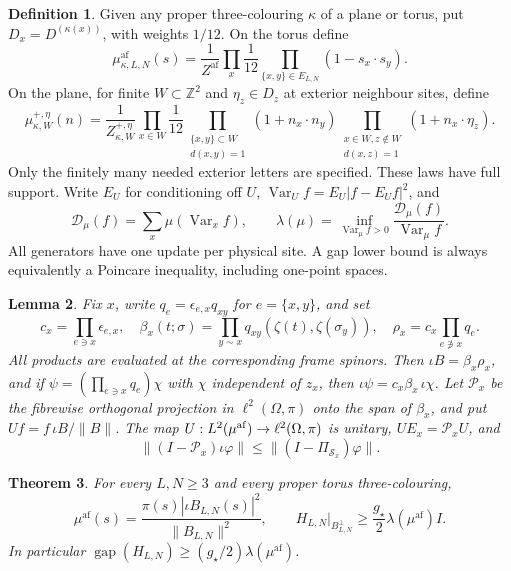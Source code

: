 \documentclass[11pt,reqno]{amsart}
\newtheorem{theorem}{Theorem}[section]
\newtheorem{lemma}[theorem]{Lemma}
\theoremstyle{definition}
\newtheorem{definition}[theorem]{Definition}
\theoremstyle{remark}
\begin{document}
\begin{definition}\label{d:framemodel}
Given any proper three-colouring \(\kappa\) of a plane or torus,
put \(D_x=D^{(\kappa(x))}\), with weights \(1/12\).
On the torus define
\[
 \mu^{\mathrm{af}}_{\kappa,L,N}(s)=
 \frac1{Z^{\mathrm{af}}}\prod_x\frac1{12}
       \prod_{\{x,y\}\in E_{L,N}}(1-s_x\cdot s_y).
\]
On the plane, for finite \(W\subset\mathbb Z^2\) and
\(\eta_z\in D_z\) at exterior neighbour sites, define
\[
 \mu^{+,\eta}_{\kappa,W}(n)=\frac1{Z^{+,\eta}_{\kappa,W}}
 \prod_{x\in W}\frac1{12}
 \prod_{\substack{\{x,y\}\subset W\\d(x,y)=1}}(1+n_x\cdot n_y)
 \prod_{\substack{x\in W,z\notin W\\d(x,z)=1}}(1+n_x\cdot\eta_z).
\]
Only the finitely many needed exterior letters are specified.
These laws have full support. Write \(E_U\) for conditioning off \(U\),
\(\operatorname{Var}_U f=E_U|f-E_Uf|^2\), and
\[
 \mathcal D_\mu(f)=\sum_x\mu(\operatorname{Var}_x f),\qquad
 \lambda(\mu)=\inf_{\operatorname{Var}_\mu f>0}
             \frac{\mathcal D_\mu(f)}{\operatorname{Var}_\mu f}.
\]
All generators have one update per physical site. A gap lower bound is
always equivalently a Poincare inequality, including one-point spaces.
\end{definition}

\begin{lemma}\label{l:quantumfibre}
Fix \(x\), write \(q_e=\epsilon_{e,x}q_{xy}\) for \(e=\{x,y\}\),
and set
\[
 c_x=\prod_{e\ni x}\epsilon_{e,x},\quad
 \beta_x(t;\sigma)=\prod_{y\sim x}q_{xy}(\zeta(t),\zeta(\sigma_y)),
 \quad \rho_x=c_x\prod_{e\not\ni x}q_e .
\]
All products are evaluated at the corresponding frame spinors.
Then \(\iota B=\beta_x\rho_x\), and if
\(\psi=(\prod_{e\ni x}q_e)\chi\) with \(\chi\) independent of \(z_x\),
then \(\iota\psi=c_x\beta_x\,\iota\chi\).
Let \(\mathcal P_x\) be the fibrewise orthogonal projection in
\(\ell^2(\Omega,\pi)\) onto the span of \(\beta_x\), and put
\(Uf=f\,\iota B/\|B\|\).
The map \(U:L^2(\mu^{\rm af})\to\ell^2(\Omega,\pi)\) is unitary,
\(UE_x=\mathcal P_xU\), and
\[
 \|(I-\mathcal P_x)\iota\varphi\|
            \le\|(I-\Pi_{\mathcal S_x})\varphi\|.
\]
\end{lemma}

\begin{theorem}\label{t:QD}
For every \(L,N\ge3\) and every proper torus three-colouring,
\[
 \mu^{\mathrm{af}}(s)=
 \frac{\pi(s)|\iota B_{L,N}(s)|^2}{\|B_{L,N}\|^2},\qquad
 H_{L,N}\big|_{B_{L,N}^{\perp}}\ge
       \frac{g_\star}{2}\lambda(\mu^{\mathrm{af}})I .
\]
In particular
\(\operatorname{gap}(H_{L,N})\ge(g_\star/2)\lambda(\mu^{\mathrm{af}})\).
\end{theorem}
\end{document}
